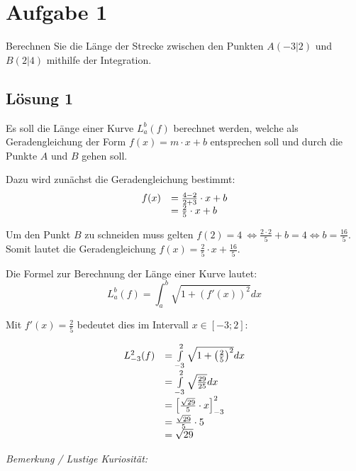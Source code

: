 \documentclass[main.tex]{subfiles}
\begin{document}
\section{Aufgabe 1}

Berechnen Sie die Länge der Strecke zwischen den Punkten $A(-3|2)$ und $B( 2|4)$ mithilfe der Integration.

\subsection{Lösung 1}
Es soll die Länge einer Kurve $L_{a}^{b}( f)$ berechnet werden, welche als Geradengleichung der Form $f( x) =m\cdotp x+b$ entsprechen soll und durch die Punkte $A$ und $B$ gehen soll.

Dazu wird zunächst die Geradengleichung bestimmt:
\begin{equation*}
    \begin{array}{ c l }
        f( x) & =\frac{4-2}{2+3} \cdotp x+b\\
        & =\frac{2}{5} \cdotp x+b
    \end{array}
\end{equation*}

Um den Punkt $B$ zu schneiden muss gelten $f( 2) =4\ \Leftrightarrow \frac{2\cdotp 2}{5} +b=4\Leftrightarrow b=\frac{16}{5}$. Somit lautet die Geradengleichung $f( x) =\frac{2}{5} \cdotp x+\frac{16}{5}$.

Die Formel zur Berechnung der Länge einer Kurve lautet:
\begin{equation*}
    L_{a}^{b}( f) =\int _{a}^{b}\sqrt{1+( f'( x))^{2}} dx
\end{equation*}

Mit $f'( x) =\frac{2}{5}$ bedeutet dies im Intervall $x\in [ -3;2]$:

\begin{equation*}
    \begin{array}{ c l }
    L_{-3}^{2}( f) & =\int\limits _{-3}^{2}\sqrt{1+\left(\frac{2}{5}\right)^{2}} dx\\
    & =\int\limits _{-3}^{2}\sqrt{\frac{29}{25}} dx\\
    & =\left[\frac{\sqrt{29}}{5} \cdotp x\right]_{-3}^{2}\\
    & =\frac{\sqrt{29}}{5} \cdotp 5\\
    & =\sqrt{29}
    \end{array}
\end{equation*}

\textit{Bemerkung / Lustige Kuriosität:}
\end{document}
